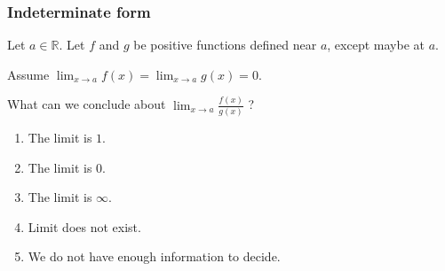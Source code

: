 \documentclass[14pt]{beamer}
\newcommand {\DS} [1] {${\displaystyle #1}$}
\newcommand {\R}{\mathbb{R}}
\begin{document}
\begin{frame}[t]
\frametitle{Indeterminate form}


Let $a \in \R$. 
Let $f$ and $g$ be positive functions defined near $a$, except maybe at $a$. 

\vfill

Assume 
	\DS{
		\lim_{x \to a} f(x) = \lim_{x \to a} g(x) = 0
	}.

\vfill

What can we conclude about  \quad
	\DS{
		\lim_{x \to a} \frac{f(x)}{g(x)} 
	} ?

\vfill

\begin{multicols}{2}
\begin{enumerate}
	\item The limit is $1$.
	\item The limit is $0$.
	\item The limit is $\infty$.
	\item Limit does not exist.
	\item  We do not have enough information to decide.
\end{enumerate}
\end{multicols}

\end{frame}
\end{document}

